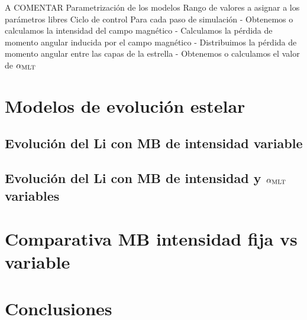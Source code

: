 A COMENTAR
Parametrización de los modelos
Rango de valores a asignar a los parámetros libres
Ciclo de control
Para cada paso de simulación
- Obtenemos o calculamos la intensidad del campo magnético
- Calculamos la pérdida de momento angular inducida por el campo magnético
- Distribuimos la pérdida de momento angular entre las capas de la estrella
- Obtenemos o calculamos el valor de $\alpha_{\mathrm{MLT}}$


\section{Modelos de evolución estelar}
\subsection{Evolución del Li con MB de intensidad variable}
\subsection{Evolución del Li con MB de intensidad y $\alpha_{\mathrm{MLT}}$ variables}
\section{Comparativa MB intensidad fija vs variable}
\section{Conclusiones}

\endinput

